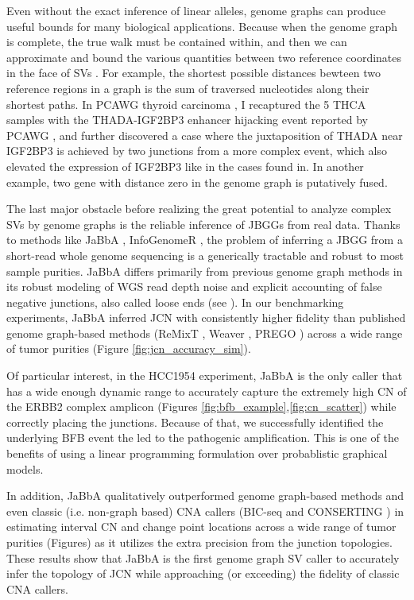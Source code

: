 \documentclass[phd,tocprelim]{cornell}
\begin{document}
Even without the exact inference of linear alleles, genome graphs can produce useful bounds for many biological applications. Because when the genome graph is complete, the true walk must be contained within, and then we can approximate and bound the various quantities between two reference coordinates in the face of SVs . For example, the shortest possible distances bewteen two reference regions in a graph is the sum of traversed nucleotides along their shortest paths. In PCAWG thyroid carcinoma \cite{Panebianco2017-xt}, I recaptured the 5 THCA samples with the THADA-IGF2BP3 enhancer hijacking event reported by PCAWG \cite{Rheinbay2020-no}, and further discovered a case where the juxtaposition of THADA near IGF2BP3 is achieved by two junctions from a more complex event, which also elevated the expression of IGF2BP3 like in the cases found in. In another example, two gene with distance zero in the genome graph is putatively fused.

The last major obstacle before realizing the great potential to analyze complex SVs by genome graphs is the reliable inference of JBGGs from real data. Thanks to methods like JaBbA \cite{Hadi2020-um}, InfoGenomeR \cite{Lee2021-rl}, the problem of inferring a JBGG from a short-read whole genome sequencing is a generically tractable and robust to most sample purities. JaBbA differs primarily from previous genome graph methods in its robust modeling of WGS read depth noise and explicit accounting of false negative junctions, also called loose ends (see ). In our benchmarking experiments, JaBbA inferred JCN with consistently higher fidelity than published genome graph-based methods (ReMixT \cite{McPherson2017-ry}, Weaver \cite{Li2016-qa}, PREGO \cite{Oesper2012-vw}) across a wide range of tumor purities (Figure \ref{fig:jcn_accuracy_sim}).

Of particular interest, in the HCC1954 experiment, JaBbA is the only caller that has a wide enough dynamic range to accurately capture the extremely high CN of the ERBB2 complex amplicon (Figures \ref{fig:bfb_example},\ref{fig:cn_scatter}) while correctly placing the junctions. Because of that, we successfully identified the underlying BFB event the led to the pathogenic amplification. This is one of the benefits of using a linear programming formulation over probablistic graphical models.

In addition, JaBbA qualitatively outperformed genome graph-based methods and even classic (i.e. non-graph based) CNA callers (BIC-seq \cite{Xi2011-oa} and CONSERTING \cite{Chen2015-sw}) in estimating interval CN and change point locations across a wide range of tumor purities (Figures) as it utilizes the extra precision from the junction topologies. These results show that JaBbA is the first genome graph SV caller to accurately infer the topology of JCN while approaching (or exceeding) the fidelity of classic CNA callers.
\end{document}
